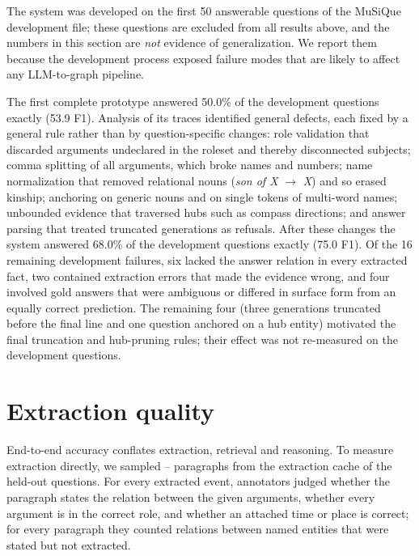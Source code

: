 \documentclass[preprint,12pt,authoryear]{elsarticle}
\providecommand{\AnnFullParagraphs}{--}
\begin{document}
The system was developed on the first 50 answerable questions of the MuSiQue development file; these questions are excluded from all results above, and the numbers in this section are \emph{not} evidence of generalization.
We report them because the development process exposed failure modes that are likely to affect any LLM-to-graph pipeline.

The first complete prototype answered 50.0\% of the development questions exactly (53.9 F1).
Analysis of its traces identified general defects, each fixed by a general rule rather than by question-specific changes:
role validation that discarded arguments undeclared in the roleset and thereby disconnected subjects;
comma splitting of all arguments, which broke names and numbers;
name normalization that removed relational nouns (\textit{son of X} $\to$ \textit{X}) and so erased kinship;
anchoring on generic nouns and on single tokens of multi-word names;
unbounded evidence that traversed hubs such as compass directions;
and answer parsing that treated truncated generations as refusals.
After these changes the system answered 68.0\% of the development questions exactly (75.0 F1).
Of the 16 remaining development failures, six lacked the answer relation in every extracted fact, two contained extraction errors that made the evidence wrong, and four involved gold answers that were ambiguous or differed in surface form from an equally correct prediction.
The remaining four (three generations truncated before the final line and one question anchored on a hub entity) motivated the final truncation and hub-pruning rules; their effect was not re-measured on the development questions.

\section{Extraction quality}
\label{sec:intrinsic}

\begin{table}[t]
\centering\small
\caption{Manual and LLM-judged assessment of extracted events.}
\label{tab:annotation}
\end{table}

End-to-end accuracy conflates extraction, retrieval and reasoning.
To measure extraction directly, we sampled \AnnFullParagraphs{} paragraphs from the extraction cache of the held-out questions.
For every extracted event, annotators judged whether the paragraph states the relation between the given arguments, whether every argument is in the correct role, and whether an attached time or place is correct; for every paragraph they counted relations between named entities that were stated but not extracted.
\end{document}
